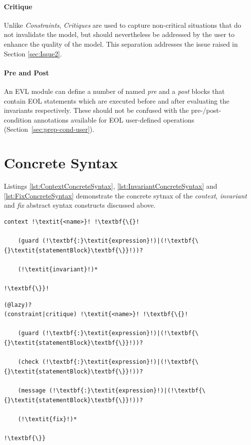 \paragraph{Critique}
Unlike \emph{Constraints}, \emph{Critiques} are used to capture non-critical situations that do not invalidate the model, but should nevertheless be addressed by the user to enhance the quality of the model. This separation addresses the issue raised in Section \ref{sec:Issue2}.

\paragraph{Pre and Post}
An EVL module can define a number of named \emph{pre} and a \emph{post} blocks that contain EOL statements which are executed before and after evaluating the invariants respectively. These should not be confused with the pre-/post-condition annotations available for EOL user-defined operations (Section~\ref{sec:prep-cond-user}).

\section{Concrete Syntax}

Listings \ref{lst:ContextConcreteSyntax}, \ref{lst:InvariantConcreteSyntax} and \ref{lst:FixConcreteSyntax} demonstrate the concrete sytnax of the \emph{context}, \emph{invariant} and \emph{fix} abstract syntax constructs discussed above.

\begin{lstlisting}[caption=Concrete Syntax of an EVL context, label=lst:ContextConcreteSyntax, language=EVL, escapechar=!]
context !\textit{<name>}! !\textbf{\{}!

	(guard (!\textbf{:}\textit{expression}!)|(!\textbf{\{}\textit{statementBlock}\textbf{\}}!))?
	
	(!\textit{invariant}!)*
	
!\textbf{\}}!
\end{lstlisting}

\begin{lstlisting}[caption=Concrete Syntax of an EVL invariant, label=lst:InvariantConcreteSyntax, language=EVL, escapechar=!]
(@lazy)?
(constraint|critique) !\textit{<name>}! !\textbf{\{}!
	
	(guard (!\textbf{:}\textit{expression}!)|(!\textbf{\{}\textit{statementBlock}\textbf{\}}!))?
	
	(check (!\textbf{:}\textit{expression}!)|(!\textbf{\{}\textit{statementBlock}\textbf{\}}!))?
	
	(message (!\textbf{:}\textit{expression}!)|(!\textbf{\{}\textit{statementBlock}\textbf{\}}!))?
	
	(!\textit{fix}!)*
	
!\textbf{\}}
\end{lstlisting}

